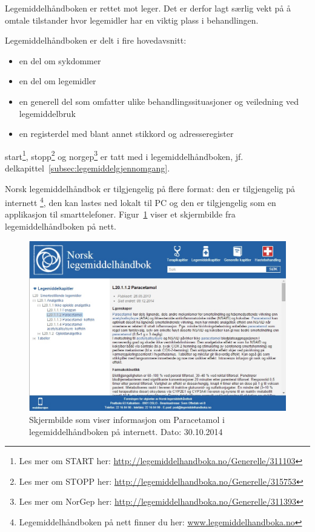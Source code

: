 Legemiddelhåndboken er rettet mot leger. Det er derfor lagt særlig vekt på å omtale tilstander hvor legemidler har en viktig plass i behandlingen.
 
Legemiddelhåndboken er delt i fire hovedavsnitt:
\begin{itemize}
    \item en del om sykdommer
    \item en del om legemidler
    \item en generell del som omfatter ulike behandlingssituasjoner og veiledning ved legemiddelbruk
    \item en registerdel med blant annet stikkord og adresseregister
\end{itemize}

\acrshort{start}\footnote{Les mer om START her: \url{http://legemiddelhandboka.no/Generelle/311103}}, \acrshort{stopp}\footnote{Les mer om STOPP her: \url{http://legemiddelhandboka.no/Generelle/315753}} og \acrshort{norgep}\footnote{Les mer om NorGep her: \url{http://legemiddelhandboka.no/Generelle/311393}} er tatt med i legemiddelhåndboken, jf. delkapittel~\ref{subsec:legemiddelgjennomgang}.

Norsk legemiddelhåndbok er tilgjengelig på flere format: den er tilgjengelig på internett \footnote{Legemiddelhåndboken på nett finner du her: \url{www.legemiddelhandboka.no}}, den kan lastes ned lokalt til PC og den er tilgjengelig som en applikasjon til smarttelefoner. Figur~\ref{fig:legemiddelhandbok} viser et skjermbilde fra legemiddelhåndboken på nett.

\begin{figure}[H]
  \centering
    \includegraphics[width=1\textwidth]{fig/dagens/paracetLegemiddelhandbok.jpg}
  \caption{Skjermbilde som viser informasjon om Paracetamol i legemiddelhåndboken på internett. Dato: 30.10.2014}
\label{fig:legemiddelhandbok}
\end{figure}


